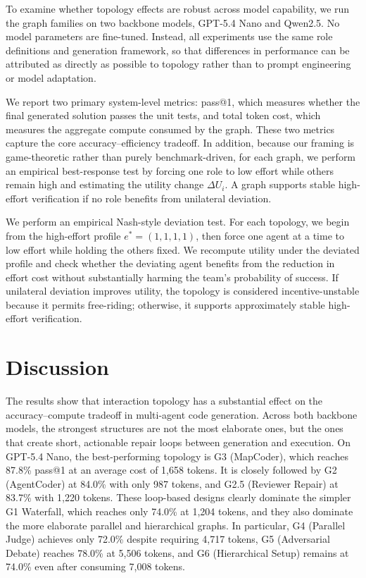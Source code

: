 \documentclass[manuscript,screen,review]{acmart}
\begin{document}
To examine whether topology effects are robust across model capability, we run the graph families on two backbone models, GPT-5.4 Nano and Qwen2.5. No model parameters are fine-tuned. Instead, all experiments use the same role definitions and generation framework, so that differences in performance can be attributed as directly as possible to topology rather than to prompt engineering or model adaptation.

We report two primary system-level metrics: pass@1, which measures whether the final generated solution passes the unit tests, and total token cost, which measures the aggregate compute consumed by the graph. These two metrics capture the core accuracy–efficiency tradeoff. In addition, because our framing is game-theoretic rather than purely benchmark-driven, for each graph, we perform an empirical best-response test by forcing one role to low effort while others remain high and estimating the utility change $\Delta U_i$. A graph supports stable high-effort verification if no role benefits from unilateral deviation.

We perform an empirical Nash-style deviation test. For each topology, we begin from the high-effort profile $e^* = (1, 1, 1, 1)$, then force one agent at a time to low effort while holding the others fixed. We recompute utility under the deviated profile and check whether the deviating agent benefits from the reduction in effort cost without substantially harming the team’s probability of success. If unilateral deviation improves utility, the topology is considered incentive-unstable because it permits free-riding; otherwise, it supports approximately stable high-effort verification.

\section{Discussion}

The results show that interaction topology has a substantial effect on the accuracy–compute tradeoff in multi-agent code generation. Across both backbone models, the strongest structures are not the most elaborate ones, but the ones that create short, actionable repair loops between generation and execution. On GPT-5.4 Nano, the best-performing topology is G3 (MapCoder), which reaches 87.8\% pass@1 at an average cost of 1,658 tokens. It is closely followed by G2 (AgentCoder) at 84.0\% with only 987 tokens, and G2.5 (Reviewer Repair) at 83.7\% with 1,220 tokens. These loop-based designs clearly dominate the simpler G1 Waterfall, which reaches only 74.0\% at 1,204 tokens, and they also dominate the more elaborate parallel and hierarchical graphs. In particular, G4 (Parallel Judge) achieves only 72.0\% despite requiring 4,717 tokens, G5 (Adversarial Debate) reaches 78.0\% at 5,506 tokens, and G6 (Hierarchical Setup) remains at 74.0\% even after consuming 7,008 tokens.
\end{document}
